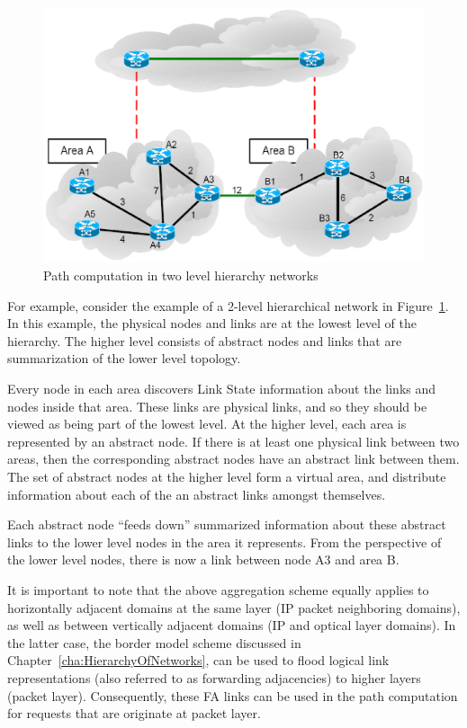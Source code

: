 \begin{figure}[t]
\centering
\includegraphics[scale=0.75]{Figures/TwoLevelHrchy.eps}
\caption{Path computation in two level hierarchy networks}
\label{fig:TwoLevelHrchy}
\end{figure}

For example, consider the example of a 2-level hierarchical network in Figure~\ref{fig:TwoLevelHrchy}. In this example, the physical nodes and links are at the lowest level of the hierarchy. The higher level consists of abstract nodes and links that are summarization of the lower level topology.

Every node in each area discovers Link State information about the links and nodes inside that area. These links are physical links, and so they should be viewed as being part of the lowest level. At the higher level, each area is represented by an abstract node. If there is at least one physical link between two areas, then the corresponding abstract nodes have an abstract link between them. The set of abstract nodes at the higher level form a virtual area, and distribute information about each of the an abstract links amongst themselves.

Each abstract node ``feeds down'' summarized information about these abstract links to the lower level nodes in the area it represents. From the perspective of the lower level nodes, there is now a link between node A3 and area B.

It is important to note that the above aggregation scheme equally applies to horizontally adjacent domains at the same layer (\eg IP packet neighboring domains), as well as between vertically adjacent domains (\eg IP and optical layer domains). In the latter case, the border model scheme discussed in Chapter~\ref{cha:HierarchyOfNetworks}, can be used to flood logical link representations (also referred to as forwarding adjacencies) to higher layers (\eg packet layer). Consequently, these FA links can be used in the path computation for requests that are originate at packet layer.

